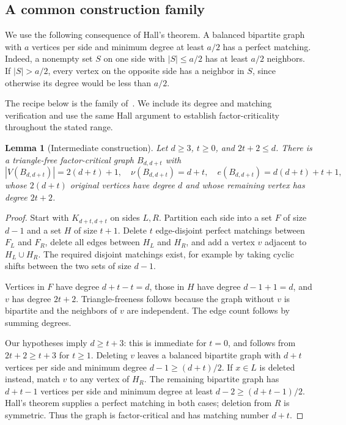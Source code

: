 \documentclass[11pt]{article}
\newtheorem{lemma}[theorem]{Lemma}
\theoremstyle{definition}
\theoremstyle{remark}
\begin{document}
\subsection{A common construction family}

We use the following consequence of Hall's theorem. A balanced bipartite
graph with $a$ vertices per side and minimum degree at least $a/2$ has a
perfect matching. Indeed, a nonempty set $S$ on one side with $|S|\le a/2$
has at least $a/2$ neighbors. If $|S|>a/2$, every vertex on the opposite
side has a neighbor in $S$, since otherwise its degree would be less than
$a/2$.

The recipe below is the family of~\cite[Proposition~4.1]{BET2023}.
We include its degree and matching verification and use the same Hall
argument to establish factor-criticality throughout the stated range.

\begin{lemma}[Intermediate construction]\label{input:construction}
Let $d\ge3$, $t\ge0$, and $2t+2\le d$. There is a triangle-free
factor-critical graph $B_{d,d+t}$ with
\[
  |V(B_{d,d+t})|=2(d+t)+1,\quad
  \nu(B_{d,d+t})=d+t,\quad
  e(B_{d,d+t})=d(d+t)+t+1,
\]
whose $2(d+t)$ original vertices have degree $d$ and whose remaining vertex
has degree $2t+2$.
\end{lemma}

\begin{proof}
Start with $K_{d+t,d+t}$ on sides $L,R$. Partition each side into a set $F$
of size $d-1$ and a set $H$ of size $t+1$. Delete $t$ edge-disjoint perfect
matchings between $F_L$ and $F_R$, delete all edges between $H_L$ and $H_R$,
and add a vertex $v$ adjacent to $H_L\cup H_R$. The required disjoint matchings
exist, for example by taking cyclic shifts between the two sets of size
$d-1$.

Vertices in $F$ have degree $d+t-t=d$, those in $H$ have degree
$d-1+1=d$, and $v$ has degree $2t+2$. Triangle-freeness follows because the
graph without $v$ is bipartite and the neighbors of $v$ are independent.
The edge count follows by summing degrees.

Our hypotheses imply $d\ge t+3$: this is immediate for $t=0$, and follows
from $2t+2\ge t+3$ for $t\ge1$. Deleting $v$ leaves a balanced bipartite
graph with $d+t$ vertices per side and minimum degree $d-1\ge(d+t)/2$.
If $x\in L$ is deleted instead, match $v$ to any vertex of $H_R$.
The remaining bipartite graph has $d+t-1$ vertices per side and minimum
degree at least $d-2\ge(d+t-1)/2$. Hall's theorem supplies a perfect
matching in both cases; deletion from $R$ is symmetric. Thus the graph
is factor-critical and has matching number $d+t$.
\end{proof}
\end{document}
